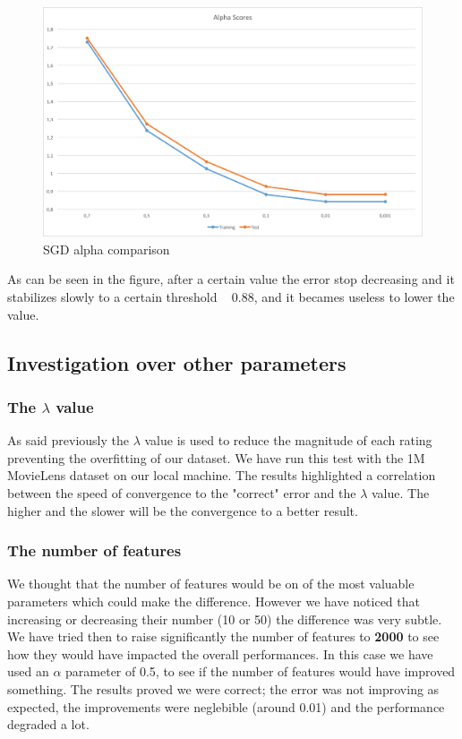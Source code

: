\documentclass{sig-alternate-05-2015}
\begin{document}
\begin{figure}
    \caption{SGD alpha comparison}
    \centering
    \includegraphics[scale=0.35]{alpha.png}
\end{figure}

As can be seen in the figure, after a certain value the error stop decreasing and
it stabilizes slowly to a certain threshold ~ 0.88, and it becames useless
to lower the value.


\subsection{Investigation over other parameters}

\subsubsection{The $\lambda$ value}
As said previously the $\lambda$ value is used to reduce the magnitude
of each rating preventing the overfitting of our dataset.
We have run this test with the 1M MovieLens dataset on our local machine. The results
highlighted a correlation between the speed of convergence to the "correct" error
and the $\lambda$ value. The higher and the slower will be the convergence to
a better result.

\subsubsection{The number of features}

We thought that the number of features would be on of the most
valuable parameters which could make the difference. However we
have noticed that increasing or decreasing their number (10 or 50)
the difference was very subtle. We have tried then to raise significantly
the number of features to \textbf{2000} to see how they would have impacted the
overall performances. In this case we have used an $\alpha$ parameter of 0.5, to
see if the number of features would have improved something. The results
proved we were correct; the error was not improving as expected, the improvements
were neglebible (around 0.01) and the performance degraded a lot.
\end{document}
